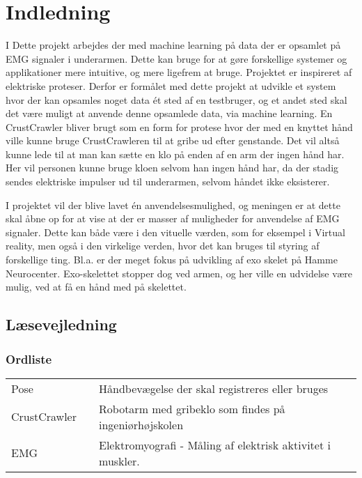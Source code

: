 \thispagestyle{fancy}
\chapter{Indledning}
\label{chp:indledning}
I Dette projekt arbejdes der med machine learning på data der er opsamlet på EMG signaler i underarmen. Dette kan bruge for at gøre forskellige systemer og applikationer mere intuitive, og mere ligefrem at bruge. Projektet er inspireret af elektriske proteser. Derfor er formålet med dette projekt at udvikle et system hvor der kan opsamles noget data ét sted af en testbruger, og et andet sted skal det være muligt at anvende denne opsamlede data, via machine learning. En CrustCrawler bliver brugt som en form for protese hvor der med en knyttet hånd ville kunne bruge CrustCrawleren til at gribe ud efter genstande. Det vil altså kunne lede til at man kan sætte en klo på enden af en arm der ingen hånd har. Her vil personen kunne bruge kloen selvom han ingen hånd har, da der stadig sendes elektriske impulser ud til underarmen, selvom håndet ikke eksisterer.

I projektet vil der blive lavet én anvendelsesmulighed, og meningen er at dette skal åbne op for at vise at der er masser af muligheder for anvendelse af EMG signaler. Dette kan både være i den vituelle værden, som for eksempel i Virtual reality, men også i den virkelige verden, hvor det kan bruges til styring af forskellige ting. Bl.a. er der meget fokus på udvikling af exo skelet på Hamme Neurocenter. Exo-skelettet stopper dog ved armen, og her ville en udvidelse være mulig, ved at få en hånd med på skelettet.

\section{Læsevejledning}
\subsection*{Ordliste}
\begin{tabular}{lll}
	Pose && Håndbevægelse der skal registreres eller bruges\\
	CrustCrawler && Robotarm med gribeklo som findes på ingeniørhøjskolen\\
	EMG && Elektromyografi - Måling af elektrisk aktivitet i muskler.
\end{tabular}